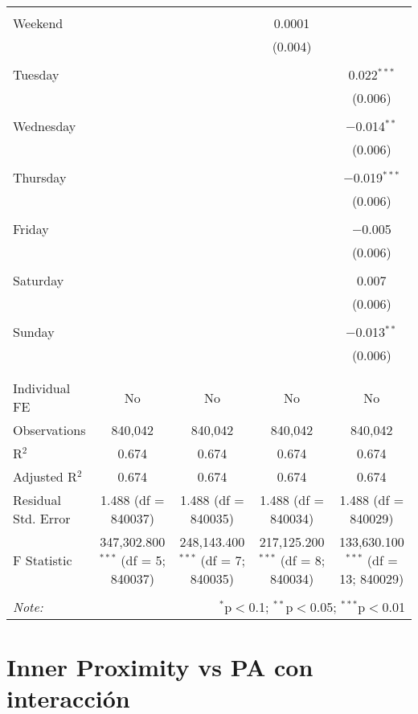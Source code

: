 \documentclass[
]{article}
\begin{document}
\begin{table}[!htbp]
{\begin{tabular}{@{\extracolsep{5pt}}lcccc}
  & & & & \\ 
 Weekend &  &  & 0.0001 &  \\ 
  &  &  & (0.004) &  \\ 
  & & & & \\ 
 Tuesday &  &  &  & 0.022$^{***}$ \\ 
  &  &  &  & (0.006) \\ 
  & & & & \\ 
 Wednesday &  &  &  & $-$0.014$^{**}$ \\ 
  &  &  &  & (0.006) \\ 
  & & & & \\ 
 Thursday &  &  &  & $-$0.019$^{***}$ \\ 
  &  &  &  & (0.006) \\ 
  & & & & \\ 
 Friday &  &  &  & $-$0.005 \\ 
  &  &  &  & (0.006) \\ 
  & & & & \\ 
 Saturday &  &  &  & 0.007 \\ 
  &  &  &  & (0.006) \\ 
  & & & & \\ 
 Sunday &  &  &  & $-$0.013$^{**}$ \\ 
  &  &  &  & (0.006) \\ 
  & & & & \\ 
\hline \\[-1.8ex] 
Individual FE & No & No & No & No \\ 
Observations & 840,042 & 840,042 & 840,042 & 840,042 \\ 
R$^{2}$ & 0.674 & 0.674 & 0.674 & 0.674 \\ 
Adjusted R$^{2}$ & 0.674 & 0.674 & 0.674 & 0.674 \\ 
Residual Std. Error & 1.488 (df = 840037) & 1.488 (df = 840035) & 1.488 (df = 840034) & 1.488 (df = 840029) \\ 
F Statistic & 347,302.800$^{***}$ (df = 5; 840037) & 248,143.400$^{***}$ (df = 7; 840035) & 217,125.200$^{***}$ (df = 8; 840034) & 133,630.100$^{***}$ (df = 13; 840029) \\ 
\hline 
\hline \\[-1.8ex] 
\textit{Note:}  & \multicolumn{4}{r}{$^{*}$p$<$0.1; $^{**}$p$<$0.05; $^{***}$p$<$0.01} \\ 
\end{tabular}
} 
\end{table} 
\newpage
\section{Inner Proximity vs PA con interacción}
\end{document}
